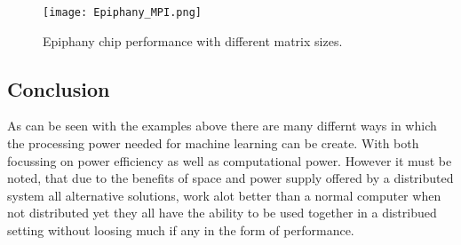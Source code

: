 \begin{figure}
  \texttt{[image: Epiphany\_MPI.png]}
  \caption{Epiphany chip performance with different matrix sizes\cite{Rich15}.}
  \label{Epiphany_MPI}
\end{figure}

\subsection{Conclusion}
As can be seen with the examples above there are many differnt ways in which the
processing power needed for machine learning can be create. With both focussing
on power efficiency as well as computational power. However it must be noted,
that due to the benefits of space and power supply offered by a distributed system
all alternative solutions, work alot better than a normal computer when not distributed
yet they all have the ability to be used together in a distribued setting without
loosing much if any in the form of performance.
